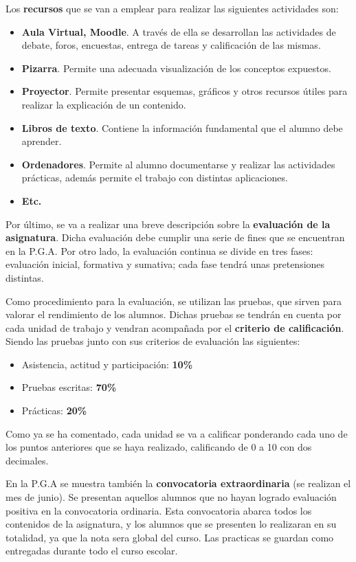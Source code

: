 \documentclass[spanish,12pt, a4paper,twoside]{paper}
\begin{document}
Los \textbf{recursos} que se van a emplear para realizar las siguientes actividades son:
\begin{itemize}
\item \textbf{Aula Virtual, Moodle}. A través de ella se desarrollan las actividades de debate, foros, encuestas, entrega de tareas y calificación de las mismas.
\item \textbf{Pizarra}. Permite una adecuada visualización de los conceptos expuestos.
\item \textbf{Proyector}. Permite presentar esquemas, gráficos y otros recursos útiles para realizar la explicación de un contenido.
\item \textbf{Libros de texto}. Contiene la información fundamental que el alumno debe aprender.
\item \textbf{Ordenadores}. Permite al alumno documentarse y realizar las actividades prácticas, además permite el trabajo con distintas aplicaciones.
\item \textbf{Etc.}
\end{itemize}

Por último, se va a realizar una breve descripción sobre la \textbf{evaluación de la asignatura}. Dicha evaluación debe cumplir una serie de fines que se encuentran en la P.G.A. Por otro lado, la evaluación continua se divide en tres fases: evaluación inicial, formativa y sumativa; cada fase tendrá unas pretensiones distintas. 

Como procedimiento para la evaluación, se utilizan las pruebas, que sirven para valorar el rendimiento de los alumnos. Dichas pruebas se tendrán en cuenta por cada unidad de trabajo y vendran acompañada por el \textbf{criterio de calificación}. Siendo las pruebas junto con sus criterios de evaluación las siguientes:
\begin{itemize}
\item Asistencia, actitud y participación: \textbf{10\%}
\item Pruebas escritas: \textbf{70\%}
\item Prácticas: \textbf{20\%}
\end{itemize}

Como ya se ha comentado, cada unidad se va a calificar ponderando cada uno de los puntos anteriores que se haya realizado, calificando de 0 a 10 con dos decimales.

En la P.G.A se muestra también la \textbf{convocatoria extraordinaria} (se realizan el mes de junio). Se presentan aquellos alumnos que no hayan logrado evaluación positiva en la convocatoria ordinaria. Esta convocatoria abarca todos los contenidos de la asignatura, y los alumnos que se presenten lo realizaran en su totalidad, ya que la nota sera global del curso. Las practicas se guardan como entregadas durante todo el curso escolar.
\end{document}
